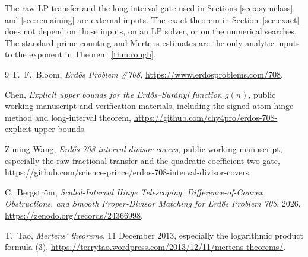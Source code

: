 \documentclass[11pt,a4paper]{article}
\theoremstyle{remark}
\begin{document}
The raw LP transfer and the long-interval gate used in Sections
\ref{sec:asymclass} and \ref{sec:remaining} are external inputs.
The exact theorem in Section~\ref{sec:exact} does not depend on those
inputs, on an LP solver, or on the numerical searches.
The standard prime-counting and Mertens estimates are the only
analytic inputs to the exponent in Theorem~\ref{thm:rough}.

\begin{thebibliography}{9}
T.~F.~Bloom, \emph{Erd\H{o}s Problem \#708},
\url{https://www.erdosproblems.com/708}.

Chen, \emph{Explicit upper bounds for the Erd\H{o}s--Sur\'anyi
function \(g(n)\)}, public working manuscript and verification
materials, including the signed atom-hinge method and long-interval
theorem,
\url{https://github.com/chy4pro/erdos-708-explicit-upper-bounds}.

Ziming Wang, \emph{Erd\H{o}s 708 interval divisor covers},
public working manuscript, especially the raw fractional transfer
and the quadratic coefficient-two gate,
\url{https://github.com/science-prince/erdos-708-interval-divisor-covers}.

C.~Bergstr\"om, \emph{Scaled-Interval Hinge Telescoping,
Difference-of-Convex Obstructions, and Smooth Proper-Divisor
Matching for Erd\H{o}s Problem 708}, 2026,
\url{https://zenodo.org/records/24366998}.

T.~Tao, \emph{Mertens' theorems}, 11 December 2013, especially
the logarithmic product formula (3),
\url{https://terrytao.wordpress.com/2013/12/11/mertens-theorems/}.
\end{thebibliography}
\end{document}
